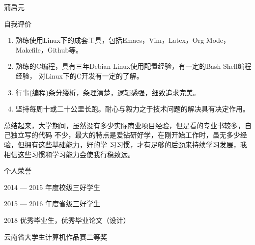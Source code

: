 \documentclass{wx672article} %
\begin{document}
\begin{cv}{蒲启元}
\begin{cvlist}{自我评价}
\begin{enumerate}
    \item 熟练使用Linux下的成套工具，包括Emacs，Vim，Latex，Org-Mode，Makefile，Github等。
    \item 熟练的C编程，具有三年Debian Linux使用配置经验，有一定的Bash Shell编程经验，
      对Linux下的C开发有一定的了解。
    \item 行事(编程)条分缕析，条理清楚，逻辑感强，细致追求完美。
    \item 坚持每周十或二十公里长跑。耐心与毅力之于技术问题的解决具有决定作用。
    \end{enumerate}
    总结起来，大学期间，虽然没有多少实际商业项目经验，但是看的专业书较多，自己独立写的代码
    不少，最大的特点是爱钻研好学，在刚开始工作时，虽无多少经验，但拥有这些基础能力，好的学
    习习惯，才有足够的后劲来持续学习发展，我相信这些习惯和学习能力会使我行稳致远。
  \end{cvlist}
  \begin{cvlist}{个人荣誉}
  \item[2014 — 2015] 年度校级三好学生
  \item[2015 — 2016] 年度省级三好学生
  \item[2018] 优秀毕业生，优秀毕业论文（设计）
  \item[] 云南省大学生计算机作品赛二等奖
  \end{cvlist}
\end{cv}
\end{document}
